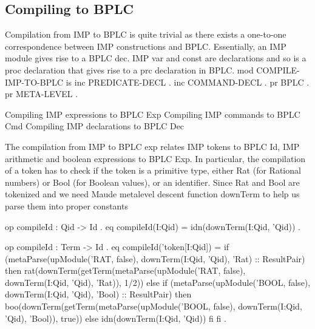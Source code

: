 \documentclass{llncs}%
\begin{document}
\subsection{Compiling to BPLC}

Compilation from IMP to BPLC is quite trivial as there exists a one-to-one correspondence between IMP constructions and BPLC. Essentially, an IMP {\Tt{}module\nwendquote} gives rise to a BPLC {\Tt{}dec\nwendquote}. IMP {\Tt{}var\nwendquote} and {\Tt{}const\nwendquote} are declarations and so is a {\Tt{}proc\nwendquote} declaration that gives rise to a {\Tt{}prc\nwendquote} declaration in BPLC. 
\nwenddocs{}\endmoddef\nwstartdeflinemarkup\nwenddeflinemarkup
mod COMPILE-IMP-TO-BPLC is
 inc PREDICATE-DECL .
 inc COMMAND-DECL .
 pr BPLC .
 pr META-LEVEL .

 \LA{}Compiling IMP expressions to BPLC Exp\RA{}
 \LA{}Compiling IMP commands to BPLC Cmd\RA{} 
 \LA{}Compiling IMP declarations to BPLC Dec\RA{}
\nwendcode{}\nwdocspar

The compilation from IMP to BPLC exp relates IMP tokens to BPLC Id, IMP arithmetic and boolean expressions to BPLC Exp. In particular, the compilation of a {\Tt{}token\nwendquote} has to check if the token is a primitive type, either {\Tt{}Rat\nwendquote} (for Rational numbers) or {\Tt{}Bool\nwendquote} (for Boolean values), or an identifier. Since {\Tt{}Rat\nwendquote} and {\Tt{}Bool\nwendquote} are tokenized and we need Maude metalevel descent function {\Tt{}downTerm\nwendquote} to help us parse them into proper constants
 
\nwenddocs{}\endmoddef\nwstartdeflinemarkup\nwenddeflinemarkup
 op compileId : Qid -> Id .
 eq compileId(I:Qid) = idn(downTerm(I:Qid, 'Qid)) .

 op compileId : Term -> Id .
 eq compileId('token[I:Qid]) =
    if (metaParse(upModule('RAT, false), 
         downTerm(I:Qid, 'Qid), 'Rat)  :: ResultPair)
        then rat(downTerm(getTerm(metaParse(upModule('RAT, false),
              downTerm(I:Qid, 'Qid), 'Rat)), 1/2))
    else
     if (metaParse(upModule('BOOL, false), 
          downTerm(I:Qid, 'Qid), 'Bool) :: ResultPair)
     then boo(downTerm(getTerm(metaParse(upModule('BOOL, false),
                   downTerm(I:Qid, 'Qid), 'Bool)), true))
     else idn(downTerm(I:Qid, 'Qid))
     fi
    fi .
\nwendcode{}\nwdocspar
\end{document}
